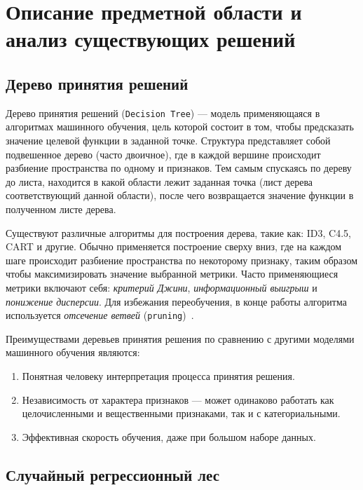 \chapter{Описание предметной области и анализ существующих решений}\label{chap:first}

\section{Дерево принятия решений}\label{sec:tree}

Дерево принятия решений (\texttt{Decision Tree})\cite{tree} --- модель
применяющаяся в алгоритмах машинного обучения, цель которой состоит в том, чтобы
предсказать значение целевой функции в заданной точке. Структура представляет
собой подвешенное дерево (часто двоичное), где в каждой вершине происходит
разбиение пространства по одному и признаков. Тем самым спускаясь по дереву до
листа, находится в какой области лежит заданная точка (лист дерева
соответствующий данной области), после чего возвращается значение функции
в полученном листе дерева.

Существуют различные алгоритмы для построения дерева, такие как: ID3, C4.5, CART
и другие. Обычно применяется построение сверху вниз, где на каждом шаге
происходит разбиение пространства по некоторому признаку, таким образом чтобы
максимизировать значение выбранной метрики. Часто применяющиеся метрики включают
себя: \emph{критерий Джини}, \emph{информационный выигрыш} и \emph{понижение
дисперсии}. Для избежания переобучения, в конце работы алгоритма используется
\emph{отсечение ветвей} (\texttt{pruning})~\cite{pruning}.

Преимуществами деревьев принятия решения по сравнению с другими моделями
машинного обучения являются:

\begin{enumerate}
    \item Понятная человеку интерпретация процесса принятия решения.
    \item Независимость от характера признаков --- может одинаково работать как
    целочисленными и вещественными признаками, так и с категориальными.
    \item Эффективная скорость обучения, даже при большом наборе данных.
\end{enumerate}

\section{Случайный регрессионный лес}\label{sec:random_forest}

